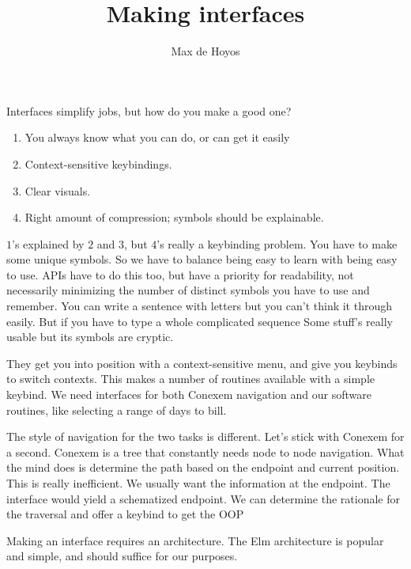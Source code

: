 \documentclass{article}
\title{Making interfaces}
\author{Max de Hoyos}
\begin{document}
\maketitle

Interfaces simplify jobs, but how do you make a good one? 

\begin{enumerate}
	\item You always know what you can do, or can get it easily
	\item Context-sensitive keybindings.
	\item Clear visuals.
	\item Right amount of compression; symbols should be explainable.
\end{enumerate}

$1$'s explained by $2$ and $3$, but $4$'s really a keybinding problem. You have to make some unique symbols. So we have to balance being easy to learn with being easy to use. APIs have to do this too, but have a priority for readability, not necessarily minimizing the number of distinct symbols you have to use and remember. You can write a sentence with letters but you can't think it through easily. But if you have to type a whole complicated sequence Some stuff's really usable but its symbols are cryptic. 

They get you into position with a context-sensitive menu, and give you keybinds to switch contexts. This makes a number of routines available with a simple keybind. We need interfaces for both Conexem navigation and our software routines, like selecting a range of days to bill.

The style of navigation for the two tasks is different. Let's stick with Conexem for a second. Conexem is a tree that constantly needs node to node navigation. What the mind does is determine the path based on the endpoint and current position. This is really inefficient. We usually want the information at the endpoint. The interface would yield a schematized endpoint. We can determine the rationale for the traversal and offer a keybind to get the OOP 

Making an interface requires an architecture. The Elm architecture is popular and simple, and should suffice for our purposes.
\end{document}
